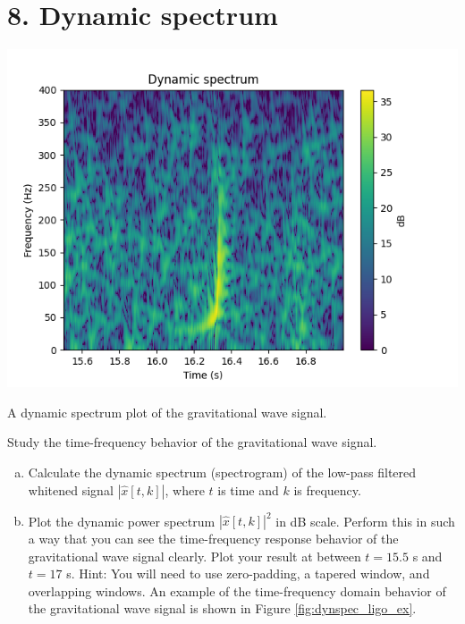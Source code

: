 \section{8. Dynamic spectrum}

\begin{marginfigure}
  \begin{center}
    \includegraphics[width=\textwidth]{Assignments/figures/dynspec.png}
  \end{center}
  \caption{A dynamic spectrum plot of the gravitational wave signal.}
  \label{fig:dynspec_ligo_ex}
\end{marginfigure}

Study the time-frequency behavior of the gravitational wave signal.
\begin{enumerate}[a)]

  \item Calculate the dynamic spectrum (spectrogram) of the low-pass
        filtered whitened signal $|\hat{x}[t,k]|$, where $t$ is time and $k$
        is frequency.

  \item Plot the dynamic power spectrum $|\hat{x}[t,k]|^2$ in dB scale.
        Perform this in such a way that you can see the time-frequency response
        behavior of the gravitational wave signal clearly. Plot your result at
        between $t=15.5$ s and $t=17$ s. Hint: You will need to use zero-padding,
        a tapered window, and overlapping windows. An example of the time-frequency
        domain behavior of the gravitational wave signal is shown in Figure \ref{fig:dynspec_ligo_ex}.


\end{enumerate}


